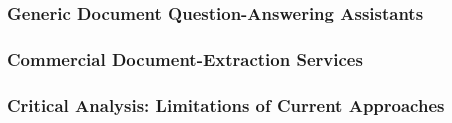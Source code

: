 \subsubsection{Generic Document Question-Answering Assistants}

\subsubsection{Commercial Document-Extraction Services}

\subsubsection{Critical Analysis: Limitations of Current Approaches}

